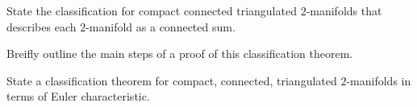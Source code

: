 \begin{alist}
\item State the classification for compact connected triangulated
$2$-manifolds that describes each $2$-manifold as a connected sum.
\item Breifly outline the main steps of a proof of this classification
theorem.
\item State a classification theorem for compact, connected,
triangulated $2$-manifolds in terms of Euler characteristic.
\end{alist}
